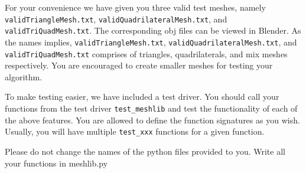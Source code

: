 \documentclass[a4paper, 11pt]{article}
\begin{document}
\begin{enumerate}
For your convenience we have given you three valid test meshes, namely \texttt{validTriangleMesh.txt}, \texttt{validQuadrilateralMesh.txt}, and \texttt{validTriQuadMesh.txt}. The corresponding obj files can be viewed in Blender. As the names implies, \texttt{validTriangleMesh.txt}, \texttt{validQuadrilateralMesh.txt}, and \texttt{validTriQuadMesh.txt}  comprises of triangles, quadrilaterals, and mix meshes respectively. You are encouraged to create smaller meshes for testing your algorithm.

To make testing easier, we have included a test driver. You should call your functions from the test driver \texttt{test\_meshlib} and test the functionality of each of the above features. You are allowed to define the function signatures as you wish. Usually, you will have multiple \texttt{test\_xxx} functions for a given function.

Please do not change the names of the python files provided to you. Write all your functions in meshlib.py


\end{enumerate}
\end{document}
